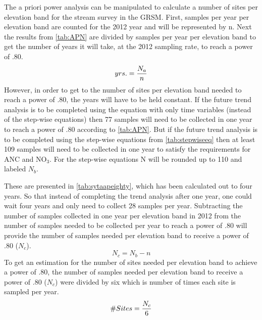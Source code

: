 The a priori power analysis can be manipulated to calculate a number of sites per elevation band for the stream survey in the GRSM.
First, samples per year per elevation band are counted for the 2012 year and will be represented by n.
Next the results from \autoref{tab:APN} are divided by samples per year per elevation band to get the number of years it will take, at the 2012 sampling rate, to reach a power of .80.
\begin{equation} \label{eq:yrs}
    yrs. = {N_a \over n}
\end{equation}
However, in order to get to the number of sites per elevation band needed to reach a power of .80, the years will have to be held constant.
If the future trend analysis is to be completed using the equation with only time variables (instead of the step-wise equations) then 77 samples will need to be collected in one year to reach a power of .80 according to \autoref{tab:APN}.
But if the future trend analysis is to be completed using the step-wise equations from \autoref{tab:stepwiseeq} then at least 109 samples will need to be collected in one year to satisfy the requirements for ANC and NO$_3$.
For the step-wise equations N will be rounded up to 110 and labeled $N_b$.



These are presented in \autoref{tab:sytaapeighty}, which has been calculated out to four years.
So that instead of completing the trend analysis after one year, one could wait four years and only need to collect 28 samples per year.
Subtracting the number of samples collected in one year per elevation band in 2012 from the number of samples needed to be collected per year to reach a power of .80 will provide the number of samples needed per elevation band to receive a power of .80 ($N_c$).
\begin{equation} \label{eq:Nc}
    N_c={N_b - n}
\end{equation}
To get an estimation for the number of sites needed per elevation band to achieve a power of .80, the number of samples needed per elevation band to receive a power of .80 ($N_c$) were divided by six which is number of times each site is sampled per year.
\begin{equation}\label{eq:sites}
    \#Sites = {N_c \over 6}
\end{equation}



